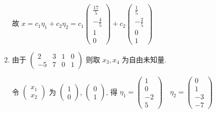 \begin{enumerate}
                   故 \( x = c_{1}\eta_{1} + c_{2}\eta_{2} = c_{1}\begin{pmatrix}
                       \frac{17}{5} \\
                       -\frac{4}{5} \\
                       1            \\
                       0
                   \end{pmatrix} + c_{2}\begin{pmatrix}
                       \frac{1}{5}  \\
                       -\frac{2}{5} \\
                       0            \\
                       1
                   \end{pmatrix} \)
             \item %
                   由于 \( \begin{pmatrix}
                       2  & 3 & 1 & 0 \\
                       -5 & 7 & 0 & 1
                   \end{pmatrix} \) 则取 \( x_{3}, x_{4} \) 为自由未知量.

                   令 \( \begin{pmatrix}
                       x_{1} \\
                       x_{2}
                   \end{pmatrix} \) 为 \( \begin{pmatrix}
                       1 \\
                       0
                   \end{pmatrix} \), \( \begin{pmatrix}
                       0 \\
                       1
                   \end{pmatrix} \), 得 \( \eta_{1} = \begin{pmatrix}
                       1  \\
                       0  \\
                       -2 \\
                       5
                   \end{pmatrix} \quad \eta_{2} = \begin{pmatrix}
                       0  \\
                       1  \\
                       -3 \\
                       -7
                   \end{pmatrix} \)


\end{enumerate}
